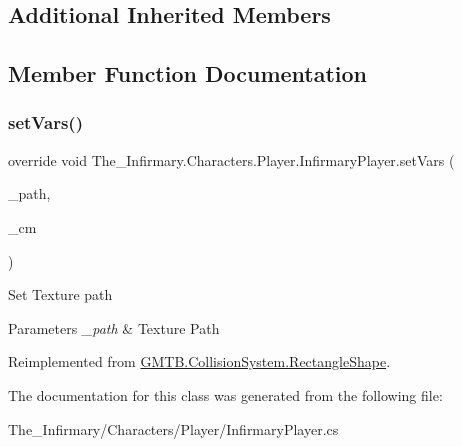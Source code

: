 \subsection*{Additional Inherited Members}


\subsection{Member Function Documentation}
\mbox{\label{class_the___infirmary_1_1_characters_1_1_player_1_1_infirmary_player_a0833a307f7cb4ef7f1dd99f10e8db6e9}} 
\subsubsection{\texorpdfstring{setVars()}{setVars()}}
{\footnotesize\ttfamily override void The\+\_\+\+Infirmary.\+Characters.\+Player.\+Infirmary\+Player.\+set\+Vars (\begin{DoxyParamCaption}\item[{string}]{\+\_\+path,  }\item[{\mbox{\hyperlink{interface_g_m_t_b_1_1_interfaces_1_1_i_content___manager}{I\+Content\+\_\+\+Manager}}}]{\+\_\+cm }\end{DoxyParamCaption})\hspace{0.3cm}{\ttfamily [virtual]}}



Set Texture path 


\begin{DoxyParams}{Parameters}
{\em \+\_\+path} & Texture Path\\
\hline
\end{DoxyParams}


Reimplemented from \mbox{\hyperlink{class_g_m_t_b_1_1_collision_system_1_1_rectangle_shape_aeb763e34b0be4dff6f0e67fb623bb246}{G\+M\+T\+B.\+Collision\+System.\+Rectangle\+Shape}}.



The documentation for this class was generated from the following file\+:\begin{DoxyCompactItemize}
\item 
The\+\_\+\+Infirmary/\+Characters/\+Player/Infirmary\+Player.\+cs\end{DoxyCompactItemize}
